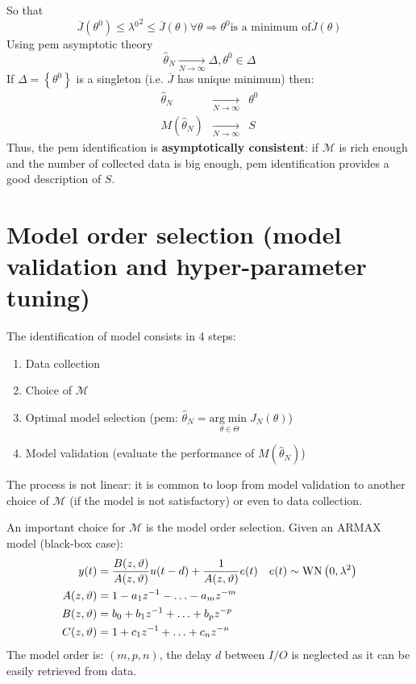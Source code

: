 So that
\begin{equation*}
\overline{J}\left(\theta ^{0}\right) \leq \lambda {^{0}}^{2} \leq \overline{J}(\theta) \forall \theta \Longrightarrow \theta ^{0} \text{is a minimum of} \overline{J}(\theta)
\end{equation*}
Using \gls{pem} asymptotic theory
\begin{equation*}
\hat{\theta }_{N}\xrightarrow[N\rightarrow \infty ]{} \Delta ,\theta ^{0} \in \Delta 
\end{equation*}
If $ \Delta =\left\{\theta ^{0}\right\}$ is a singleton (i.e. $ \overline{J}$ has unique minimum) then:
\begin{equation*}
\begin{aligned}
\hat{\theta }_{N} & \xrightarrow[N\rightarrow \infty ]{} & \theta ^{0}\\
M(\hat{\theta }_{N}) & \xrightarrow[N\rightarrow \infty ]{} & S
\end{aligned}
\end{equation*}
Thus, the \gls{pem} identification is \textbf{asymptotically consistent}: if $ \mathcal{M}$ is rich enough and the number of collected data is big enough, \gls{pem} identification provides a good description of $ S$.



\section{Model order selection (model validation and hyper-parameter tuning)}

The identification of model consists in 4 steps:
\begin{enumerate}
\item Data collection
\item Choice of $ \mathcal{M}$
\item Optimal model selection (\gls{pem}: $ \hat{\theta }_{N} =\underset{\theta \in \Theta }{\mathrm{arg}\min} J_{N}(\theta)$)
\item Model validation (evaluate the performance of $ M(\hat{\theta }_{N})$)
\end{enumerate}

The process is not linear: it is common to loop from model validation to another choice of $ \mathcal{M}$ (if the model is not satisfactory) or even to data collection.

An important choice for $ \mathcal{M}$ is the model order selection. Given an ARMAX model (black-box case):
\begin{gather*}
\begin{aligned}
y(t)  & =\frac{B(z,\vartheta)}{A(z,\vartheta)} u(t-d) +\frac{1}{A(z,\vartheta)} e(t) & e(t) \sim \operatorname{WN} \left(0,\lambda ^{2}\right)\\
A(z,\vartheta)  & =1-a_{1} z^{-1} -\dotsc -a_{m} z^{-m} & \\
B(z,\vartheta) & =b_{0} +b_{1} z^{-1} +\dotsc +b_{p} z^{-p} & \\
C(z,\vartheta) & =1+c_{1} z^{-1} +\dotsc +c_{n} z^{-n} & 
\end{aligned}\\
\end{gather*}
The model order is: $ (m,p,n)$, the delay $ d$ between $ I/O$ is neglected as it can be easily retrieved from data.

